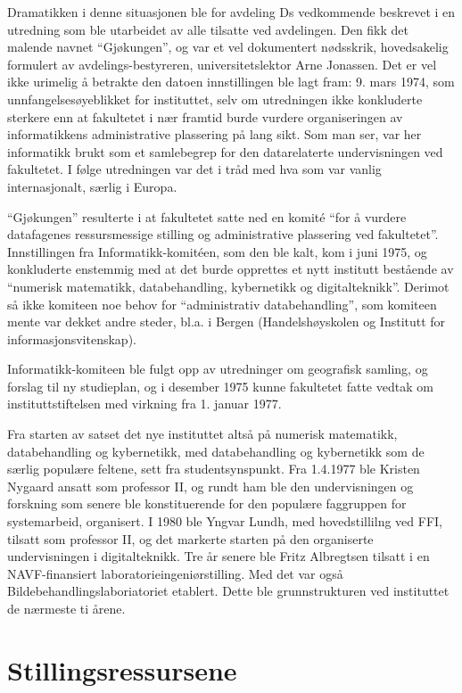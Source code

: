 \documentclass[../../main.tex]{subfiles}
\begin{document}
Dramatikken i denne situasjonen ble for avdeling Ds vedkommende beskrevet i en utredning som ble utarbeidet av alle tilsatte ved avdelingen. Den fikk det malende navnet ``Gjøkungen'', og var et vel dokumentert nødsskrik, hovedsakelig formulert av avdelings-bestyreren, universitetslektor Arne Jonassen. Det er vel ikke urimelig å betrakte den datoen innstillingen ble lagt fram: 9. mars 1974, som unnfangelsesøyeblikket for instituttet, selv om utredningen ikke konkluderte sterkere enn at fakultetet i nær framtid burde vurdere organiseringen av informatikkens administrative plassering på lang sikt. Som man ser, var her informatikk brukt som et samlebegrep for den datarelaterte undervisningen ved fakultetet. I følge utredningen
var det i tråd med hva som var vanlig internasjonalt, særlig i Europa.

``Gjøkungen'' resulterte i at fakultetet satte ned en komité ``for å vurdere datafagenes ressursmessige stilling og administrative plassering ved fakultetet''. Innstillingen fra Informatikk-komitéen, som den ble kalt, kom i juni 1975, og konkluderte enstemmig med at det burde opprettes et nytt institutt bestående av ``numerisk matematikk, databehandling, kybernetikk og digitalteknikk''. Derimot så ikke komiteen noe behov for ``administrativ databehandling'', som komiteen mente var dekket andre steder, bl.a. i Bergen (Handelshøyskolen og Institutt for informasjonsvitenskap).

Informatikk-komiteen ble fulgt opp av utredninger om geografisk samling, og forslag til ny studieplan, og i desember 1975 kunne fakultetet fatte vedtak om instituttstiftelsen med virkning fra 1. januar 1977. 

Fra starten av satset det nye instituttet altså på numerisk matematikk, databehandling og kybernetikk, med databehandling og kybernetikk som de særlig populære feltene, sett fra studentsynspunkt. Fra 1.4.1977 ble Kristen Nygaard ansatt som professor II, og rundt ham ble den undervisningen og forskning som senere ble konstituerende for den populære faggruppen for systemarbeid, organisert. I 1980 ble Yngvar Lundh, med hovedstillilng ved FFI, tilsatt som professor II, og det markerte starten på den organiserte undervisningen i digitalteknikk. Tre år senere ble Fritz Albregtsen tilsatt i en NAVF-finansiert laboratorieingeniørstilling. Med det var også Bildebehandlingslaboriatoriet etablert. Dette ble grunnstrukturen ved
instituttet de nærmeste ti årene.

\section{Stillingsressursene}
\end{document}

